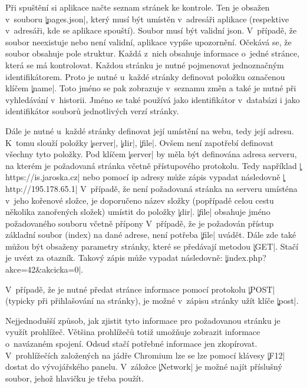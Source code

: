 
Při spuštění si aplikace načte seznam stránek ke kontrole.
Ten je obsažen v~souboru \c|pages.json|, který musí být umístěn v~adresáři aplikace (respektive v~adresáři, kde se aplikace spouští).
Soubor musí být validní json.
V~případě, že soubor neexistuje nebo není validní, aplikace vypíše upozornění. %
Očekává se, že soubor obsahuje pole struktur.
Každá z~nich obsahuje informace o~jedné stránce, která se má kontrolovat.
Každou stránku je nutné pojmenovat jednoznačným identifikátorem.
Proto je nutné u~každé stránky definovat položku označenou klíčem \c|name|.
Toto jméno se pak zobrazuje v~seznamu změn a také je nutné při vyhledávání v~historii.
Jméno se také používá jako identifikátor v~databázi i jako identifikátor souborů jednotlivých verzí stránky.

Dále je nutné u~každé stránky definovat její umístění na webu, tedy její adresu.
K~tomu slouží položky \c|server|, \c|dir|, \c|file|.
Ovšem není zapotřebí definovat všechny tyto položky.
Pod klíčem \c|server| by měla být definována adresa serveru, na kterém je požadovaná stránka včetně přístupového protokolu.
Tedy například \c|https://is.jaroska.cz| nebo pomocí ip adresy může zápis vypadat následovně \c|http://195.178.65.1|
V~případě, že není požadovaná stránka na serveru umísténa v~jeho kořenové složce, je doporučeno název složky (popřípadě celou cestu několika zanořených složek) umístit do položky \c|dir|.
\c|file| obsahuje jméno požadovaného souboru včetně přípony
V~případě, že je požadován přístup základní soubor (index) na dané adrese, není potřeba \c|file| uvádět.
Dále zde také můžou být obsaženy parametry stránky, které se předávají metodou \c|GET|.
Stačí je uvézt za otazník.
Takový zápis může vypadat následovně: \c|index.php?akce=42&akcicka=0|.

V~případě, že je nutné předat stránce informace pomocí protokolu \c|POST| (typicky při přihlašování na stránky), 
je možné v~zápisu stránky užít klíče \c|post|.

Nejjednodušší způsob, jak zjistit tyto informace pro požadovanou stránku je využít prohlížeč.
Většina prohlížečů totiž umožňuje zobrazit informace o~navázaném spojení.
Odsud stačí potřebné informace jen zkopírovat.
V~prohlížečích založených na jádře Chromium lze se lze pomocí klávesy \c|F12| dostat do vývojářského panelu.
V~záložce \c|Network| je možné najít příslušný soubor, jehož hlavičku je třeba použít.

